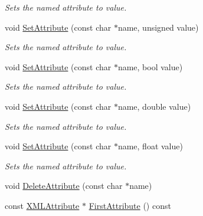 \begin{DoxyCompactItemize}
\begin{DoxyCompactList}\small\item\em Sets the named attribute to value. \end{DoxyCompactList}\item 
\hypertarget{classtinyxml2_1_1_x_m_l_element_ae143997e90064ba82326b29a9930ea8f}{}void \hyperlink{classtinyxml2_1_1_x_m_l_element_ae143997e90064ba82326b29a9930ea8f}{Set\+Attribute} (const char $\ast$name, unsigned value)\label{classtinyxml2_1_1_x_m_l_element_ae143997e90064ba82326b29a9930ea8f}

\begin{DoxyCompactList}\small\item\em Sets the named attribute to value. \end{DoxyCompactList}\item 
\hypertarget{classtinyxml2_1_1_x_m_l_element_aa848b696e6a75e4e545c6da9893b11e1}{}void \hyperlink{classtinyxml2_1_1_x_m_l_element_aa848b696e6a75e4e545c6da9893b11e1}{Set\+Attribute} (const char $\ast$name, bool value)\label{classtinyxml2_1_1_x_m_l_element_aa848b696e6a75e4e545c6da9893b11e1}

\begin{DoxyCompactList}\small\item\em Sets the named attribute to value. \end{DoxyCompactList}\item 
\hypertarget{classtinyxml2_1_1_x_m_l_element_a233397ee81e70eb5d4b814c5f8698533}{}void \hyperlink{classtinyxml2_1_1_x_m_l_element_a233397ee81e70eb5d4b814c5f8698533}{Set\+Attribute} (const char $\ast$name, double value)\label{classtinyxml2_1_1_x_m_l_element_a233397ee81e70eb5d4b814c5f8698533}

\begin{DoxyCompactList}\small\item\em Sets the named attribute to value. \end{DoxyCompactList}\item 
\hypertarget{classtinyxml2_1_1_x_m_l_element_a554b70d882e65b28fc084b23df9b9759}{}void \hyperlink{classtinyxml2_1_1_x_m_l_element_a554b70d882e65b28fc084b23df9b9759}{Set\+Attribute} (const char $\ast$name, float value)\label{classtinyxml2_1_1_x_m_l_element_a554b70d882e65b28fc084b23df9b9759}

\begin{DoxyCompactList}\small\item\em Sets the named attribute to value. \end{DoxyCompactList}\item 
void \hyperlink{classtinyxml2_1_1_x_m_l_element_aebd45aa7118964c30b32fe12e944628a}{Delete\+Attribute} (const char $\ast$name)
\item 
\hypertarget{classtinyxml2_1_1_x_m_l_element_a67593e63558ffda0386699c3e4cc0b2c}{}const \hyperlink{classtinyxml2_1_1_x_m_l_attribute}{X\+M\+L\+Attribute} $\ast$ \hyperlink{classtinyxml2_1_1_x_m_l_element_a67593e63558ffda0386699c3e4cc0b2c}{First\+Attribute} () const \label{classtinyxml2_1_1_x_m_l_element_a67593e63558ffda0386699c3e4cc0b2c}


\end{DoxyCompactItemize}
